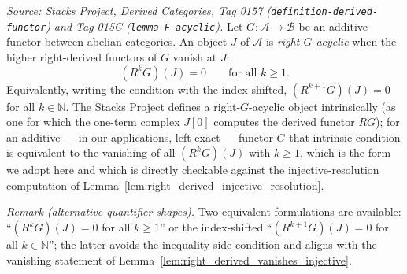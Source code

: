 \begin{definition}\leanok
  \label{def:right_acyclic}
  \textit{Source: Stacks Project, Derived Categories, Tag 0157
  (\texttt{definition-derived-functor}) and Tag 015C
  (\texttt{lemma-F-acyclic}).}
  Let \(G : \mathcal{A} \to \mathcal{B}\) be an additive functor between abelian
  categories. An object \(J\) of \(\mathcal{A}\) is \emph{right-\(G\)-acyclic} when
  the higher right-derived functors of \(G\) vanish at \(J\):
  \[
    (R^k G)(J) = 0 \qquad \text{for all } k \geq 1.
  \]
  Equivalently, writing the condition with the index shifted, \((R^{k+1} G)(J) = 0\)
  for all \(k \in \mathbb{N}\). The Stacks Project defines a right-\(G\)-acyclic
  object intrinsically (as one for which the one-term complex \(J[0]\) computes the
  derived functor \(RG\)); for an additive --- in our applications, left exact ---
  functor \(G\) that intrinsic condition is equivalent to the vanishing of all
  \((R^k G)(J)\) with \(k \geq 1\), which is the form we adopt here and which is
  directly checkable against the injective-resolution computation of
  Lemma~\ref{lem:right_derived_injective_resolution}.

  \emph{Remark (alternative quantifier shapes).} Two equivalent formulations are
  available: ``\((R^k G)(J) = 0\) for all \(k \geq 1\)'' or the index-shifted
  ``\((R^{k+1} G)(J) = 0\) for all \(k \in \mathbb{N}\)''; the latter avoids the
  inequality side-condition and aligns with the vanishing statement of
  Lemma~\ref{lem:right_derived_vanishes_injective}.
\end{definition}

